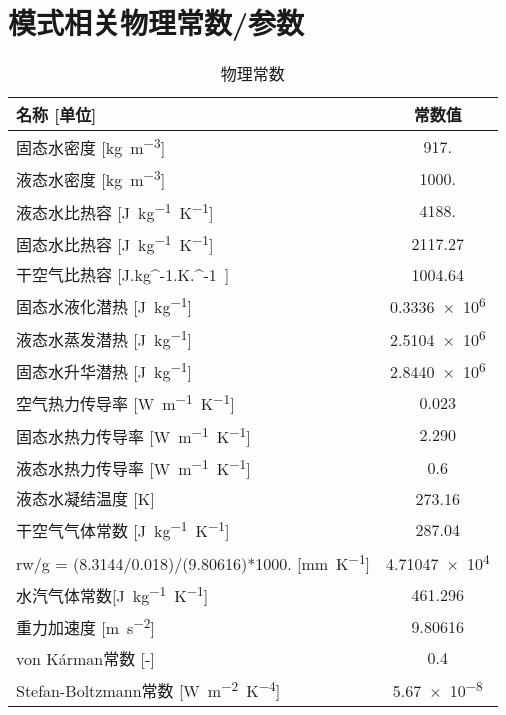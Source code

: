 \chapter{模式相关物理常数/参数}\label{模式相关物理常数参数}
\begin{table}[htbp]
    \centering
    \caption{物理常数}
    \label{tab:物理常数}
    \begin{tabular}{@{}lc@{}}
    \toprule
    名称 {[}单位{]}                                     & 常数值       \\
    \midrule
    固态水密度 {[}\unit{kg.m^{-3}}{]}                  & 917.        \\
    液态水密度 {[}\unit{kg.m^{-3}}{]}                  & 1000.       \\
    液态水比热容 {[}\unit{J.kg^{-1}.K^{-1}}{]}         & 4188.       \\
    固态水比热容 {[}\unit{J.kg^{-1}.K^{-1}}{]}         & 2117.27     \\
    干空气比热容 {[}\unit{J.kg^{-1}.K.^{-1}}{]}        & 1004.64     \\
    固态水液化潜热 {[}\unit{J.kg^{-1}}{]}             & \num{0.3336e6}  \\
    液态水蒸发潜热 {[}\unit{J.kg^{-1}}{]}             & \num{2.5104e6}  \\
    固态水升华潜热 {[}\unit{J.kg^{-1}}{]}             & \num{2.8440e6}  \\
    空气热力传导率 {[}\unit{W.m^{-1}.K^{-1}}{]}       & 0.023       \\
    固态水热力传导率 {[}\unit{W.m^{-1}.K^{-1}}{]}      & 2.290       \\
    液态水热力传导率 {[}\unit{W.m^{-1}.K^{-1}}{]}      & 0.6         \\
    液态水凝结温度 {[}K{]}                             & 273.16      \\
    干空气气体常数 {[}\unit{J.kg^{-1}.K^{-1}}{]}       & 287.04      \\
    rw/g = (8.3144/0.018)/(9.80616)*1000. {[}\unit{mm.K^{-1}}{]} & \num{4.71047e4} \\
    水汽气体常数{[}\unit{J.kg^{-1}.K^{-1}}{]}         & 461.296     \\
    重力加速度 {[}\unit{m.s^{-2}}{]}                  & 9.80616     \\
    von K\'arman常数 {[}-{]}                         & 0.4         \\
    Stefan-Boltzmann常数 {[}\unit{W.m^{-2}.K^{-4}}{]} & \num{5.67e-8}\\
    \bottomrule
    \end{tabular}
\end{table}

